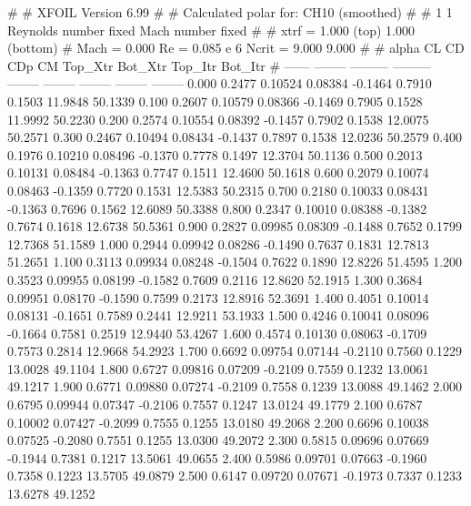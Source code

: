 #  
#       XFOIL         Version 6.99
#  
# Calculated polar for: CH10 (smoothed)                                 
#  
# 1 1 Reynolds number fixed          Mach number fixed         
#  
# xtrf =   1.000 (top)        1.000 (bottom)  
# Mach =   0.000     Re =     0.085 e 6     Ncrit =   9.000  9.000
#  
#   alpha    CL        CD       CDp       CM     Top_Xtr  Bot_Xtr  Top_Itr  Bot_Itr
#  ------ -------- --------- --------- -------- -------- -------- -------- --------
   0.000   0.2477   0.10524   0.08384  -0.1464   0.7910   0.1503  11.9848  50.1339
   0.100   0.2607   0.10579   0.08366  -0.1469   0.7905   0.1528  11.9992  50.2230
   0.200   0.2574   0.10554   0.08392  -0.1457   0.7902   0.1538  12.0075  50.2571
   0.300   0.2467   0.10494   0.08434  -0.1437   0.7897   0.1538  12.0236  50.2579
   0.400   0.1976   0.10210   0.08496  -0.1370   0.7778   0.1497  12.3704  50.1136
   0.500   0.2013   0.10131   0.08484  -0.1363   0.7747   0.1511  12.4600  50.1618
   0.600   0.2079   0.10074   0.08463  -0.1359   0.7720   0.1531  12.5383  50.2315
   0.700   0.2180   0.10033   0.08431  -0.1363   0.7696   0.1562  12.6089  50.3388
   0.800   0.2347   0.10010   0.08388  -0.1382   0.7674   0.1618  12.6738  50.5361
   0.900   0.2827   0.09985   0.08309  -0.1488   0.7652   0.1799  12.7368  51.1589
   1.000   0.2944   0.09942   0.08286  -0.1490   0.7637   0.1831  12.7813  51.2651
   1.100   0.3113   0.09934   0.08248  -0.1504   0.7622   0.1890  12.8226  51.4595
   1.200   0.3523   0.09955   0.08199  -0.1582   0.7609   0.2116  12.8620  52.1915
   1.300   0.3684   0.09951   0.08170  -0.1590   0.7599   0.2173  12.8916  52.3691
   1.400   0.4051   0.10014   0.08131  -0.1651   0.7589   0.2441  12.9211  53.1933
   1.500   0.4246   0.10041   0.08096  -0.1664   0.7581   0.2519  12.9440  53.4267
   1.600   0.4574   0.10130   0.08063  -0.1709   0.7573   0.2814  12.9668  54.2923
   1.700   0.6692   0.09754   0.07144  -0.2110   0.7560   0.1229  13.0028  49.1104
   1.800   0.6727   0.09816   0.07209  -0.2109   0.7559   0.1232  13.0061  49.1217
   1.900   0.6771   0.09880   0.07274  -0.2109   0.7558   0.1239  13.0088  49.1462
   2.000   0.6795   0.09944   0.07347  -0.2106   0.7557   0.1247  13.0124  49.1779
   2.100   0.6787   0.10002   0.07427  -0.2099   0.7555   0.1255  13.0180  49.2068
   2.200   0.6696   0.10038   0.07525  -0.2080   0.7551   0.1255  13.0300  49.2072
   2.300   0.5815   0.09696   0.07669  -0.1944   0.7381   0.1217  13.5061  49.0655
   2.400   0.5986   0.09701   0.07663  -0.1960   0.7358   0.1223  13.5705  49.0879
   2.500   0.6147   0.09720   0.07671  -0.1973   0.7337   0.1233  13.6278  49.1252

